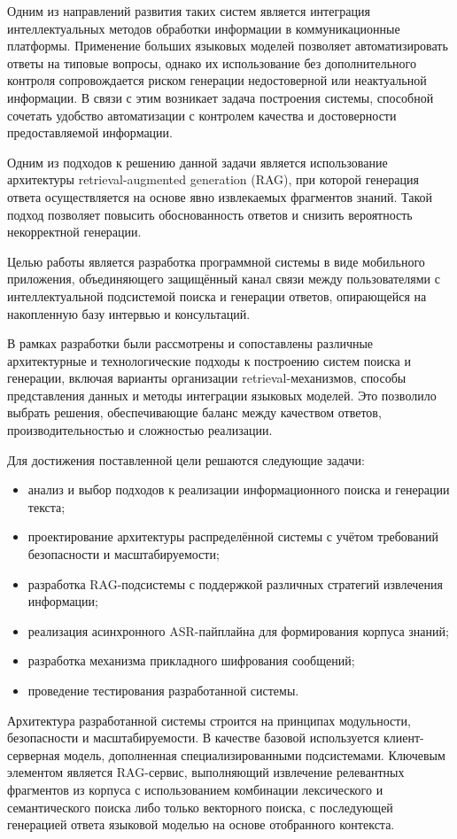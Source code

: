 \documentclass{article}
\begin{document}
Одним из направлений развития таких систем является интеграция интеллектуальных методов обработки информации в коммуникационные платформы. Применение больших языковых моделей позволяет автоматизировать ответы на типовые вопросы, однако их использование без дополнительного контроля сопровождается риском генерации недостоверной или неактуальной информации. В связи с этим возникает задача построения системы, способной сочетать удобство автоматизации с контролем качества и достоверности предоставляемой информации.

Одним из подходов к решению данной задачи является использование архитектуры retrieval-augmented generation (RAG), при которой генерация ответа осуществляется на основе явно извлекаемых фрагментов знаний. Такой подход позволяет повысить обоснованность ответов и снизить вероятность некорректной генерации.

Целью работы является разработка программной системы в виде мобильного приложения, объединяющего защищённый канал связи между пользователями с интеллектуальной подсистемой поиска и генерации ответов, опирающейся на накопленную базу интервью и консультаций.

В рамках разработки были рассмотрены и сопоставлены различные архитектурные и технологические подходы к построению систем поиска и генерации, включая варианты организации retrieval-механизмов, способы представления данных и методы интеграции языковых моделей. Это позволило выбрать решения, обеспечивающие баланс между качеством ответов, производительностью и сложностью реализации.

Для достижения поставленной цели решаются следующие задачи:
\begin{itemize}
\item анализ и выбор подходов к реализации информационного поиска и генерации текста;
\item проектирование архитектуры распределённой системы с учётом требований безопасности и масштабируемости;
\item разработка RAG-подсистемы с поддержкой различных стратегий извлечения информации;
\item реализация асинхронного ASR-пайплайна для формирования корпуса знаний;
\item разработка механизма прикладного шифрования сообщений;
\item проведение тестирования разработанной системы.
\end{itemize}

Архитектура разработанной системы строится на принципах модульности, безопасности и масштабируемости. В качестве базовой используется клиент-серверная модель, дополненная специализированными подсистемами. Ключевым элементом является RAG-сервис, выполняющий извлечение релевантных фрагментов из корпуса с использованием комбинации лексического и семантического поиска либо только векторного поиска, с последующей генерацией ответа языковой моделью на основе отобранного контекста.
\end{document}
